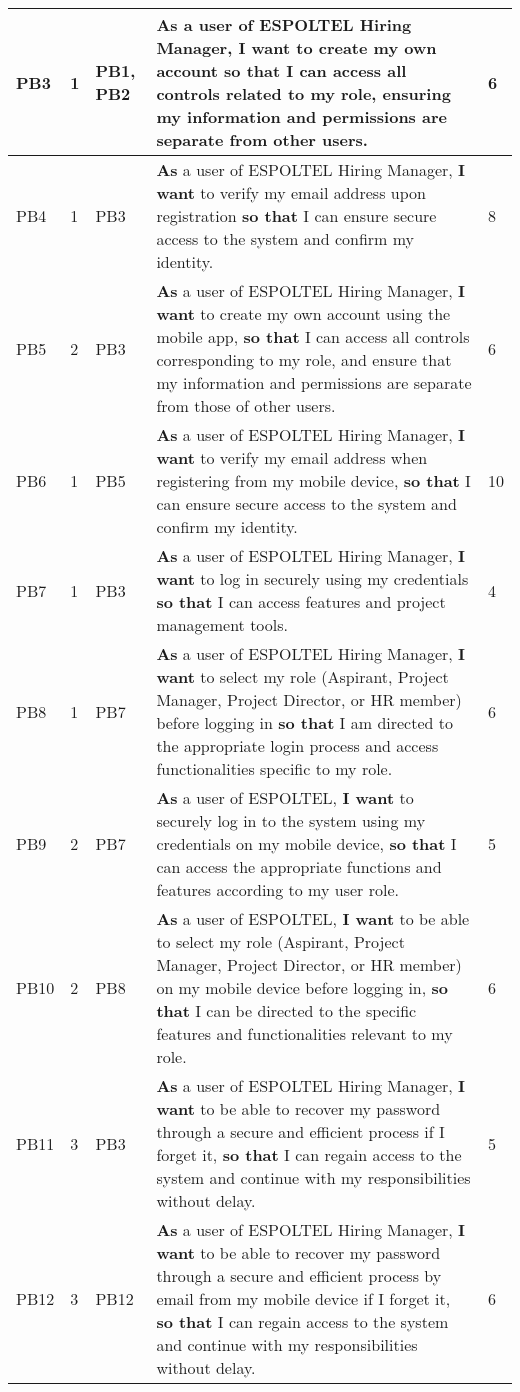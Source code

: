 \documentclass{scrreprt}
\begin{document}
\begin{longtable}{|p{0.8cm}|p{1.5cm}|p{2.5cm}|p{8cm}|p{2cm}|}
	PB3 & 1 & PB1, PB2 & \textbf{As} a user of ESPOLTEL Hiring Manager, \textbf{I want} to create my own account \textbf{so that} I can access all controls related to my role, ensuring my information and permissions are separate from other users. & 6 \\ \hline
	PB4 & 1 & PB3 & \textbf{As} a user of ESPOLTEL Hiring Manager, \textbf{I want} to verify my email address upon registration \textbf{so that} I can ensure secure access to the system and confirm my identity. & 8 \\ \hline
	PB5 & 2 & PB3 & \textbf{As} a user of ESPOLTEL Hiring Manager, \textbf{I want} to create my own account using the mobile app, \textbf{so that} I can access all controls corresponding to my role, and ensure that my information and permissions are separate from those of other users. & 6 \\ \hline
	PB6 & 1 & PB5 & \textbf{As} a user of ESPOLTEL Hiring Manager, \textbf{I want} to verify my email address when registering from my mobile device, \textbf{so that} I can ensure secure access to the system and confirm my identity. & 10 \\ \hline
	PB7 & 1 & PB3 & \textbf{As} a user of ESPOLTEL Hiring Manager, \textbf{I want} to log in securely using my credentials \textbf{so that} I can access features and project management tools. & 4\\ \hline
	PB8 & 1 & PB7 & \textbf{As} a user of ESPOLTEL Hiring Manager, \textbf{I want} to select my role (Aspirant, Project Manager, Project Director, or HR member) before logging in \textbf{so that} I am directed to the appropriate login process and access functionalities specific to my role. & 6 \\ \hline
	PB9 & 2 & PB7 & \textbf{As} a user of ESPOLTEL, \textbf{I want} to securely log in to the system using my credentials on my mobile device, \textbf{so that} I can access the appropriate functions and features according to my user role. & 5 \\ \hline
	PB10 & 2 & PB8 & \textbf{As} a user of ESPOLTEL, \textbf{I want} to be able to select my role (Aspirant, Project Manager, Project Director, or HR member) on my mobile device before logging in, \textbf{so that} I can be directed to the specific features and functionalities relevant to my role. &  6 \\ \hline
	PB11 & 3 & PB3 & \textbf{As} a user of ESPOLTEL Hiring Manager, \textbf{I want} to be able to recover my password through a secure and efficient process if I forget it, \textbf{so that} I can regain access to the system and continue with my responsibilities without delay. & 5 \\ \hline
	PB12 & 3 & PB12 & \textbf{As} a user of ESPOLTEL Hiring Manager, \textbf{I want} to be able to recover my password through a secure and efficient process by email from my mobile device if I forget it, \textbf{so that} I can regain access to the system and continue with my responsibilities without delay. & 6 \\ \hline
	

\end{longtable}
\end{document}

